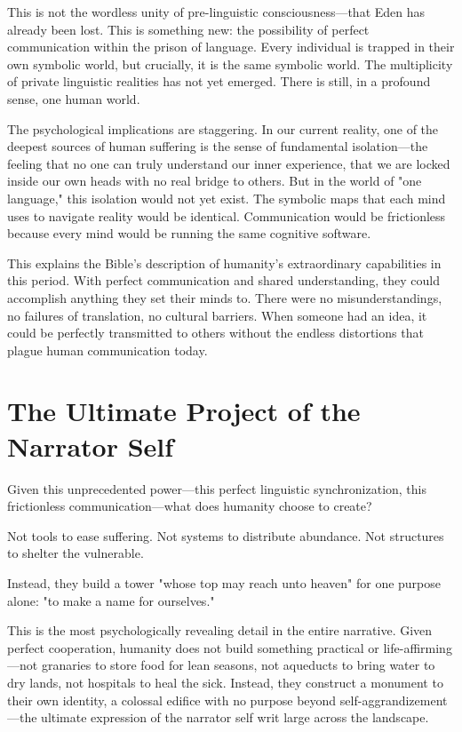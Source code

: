 This is not the wordless unity of pre-linguistic consciousness—that Eden has already been lost. This is something new: the possibility of perfect communication within the prison of language. Every individual is trapped in their own symbolic world, but crucially, it is the same symbolic world. The multiplicity of private linguistic realities has not yet emerged. There is still, in a profound sense, one human world.

The psychological implications are staggering. In our current reality, one of the deepest sources of human suffering is the sense of fundamental isolation—the feeling that no one can truly understand our inner experience, that we are locked inside our own heads with no real bridge to others. But in the world of "one language," this isolation would not yet exist. The symbolic maps that each mind uses to navigate reality would be identical. Communication would be frictionless because every mind would be running the same cognitive software.

This explains the Bible's description of humanity's extraordinary capabilities in this period. With perfect communication and shared understanding, they could accomplish anything they set their minds to. There were no misunderstandings, no failures of translation, no cultural barriers. When someone had an idea, it could be perfectly transmitted to others without the endless distortions that plague human communication today.

\section{The Ultimate Project of the Narrator Self}

Given this unprecedented power—this perfect linguistic synchronization, this frictionless communication—what does humanity choose to create?

Not tools to ease suffering. Not systems to distribute abundance. Not structures to shelter the vulnerable.

Instead, they build a tower "whose top may reach unto heaven" for one purpose alone: "to make a name for ourselves." 

This is the most psychologically revealing detail in the entire narrative. Given perfect cooperation, humanity does not build something practical or life-affirming—not granaries to store food for lean seasons, not aqueducts to bring water to dry lands, not hospitals to heal the sick. Instead, they construct a monument to their own identity, a colossal edifice with no purpose beyond self-aggrandizement—the ultimate expression of the narrator self writ large across the landscape.

